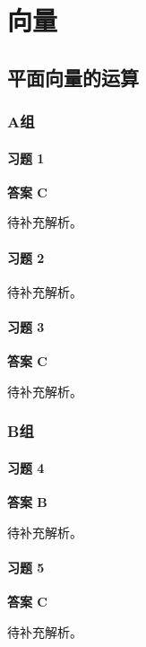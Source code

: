 \chapter{向量}

\section{平面向量的运算}

\subsection*{A组}

\subsubsection*{习题 1}
\begin{solution}
	\textbf{答案 C}

	待补充解析。
\end{solution}

\subsubsection*{习题 2}
\begin{solution}
	待补充解析。
\end{solution}

\subsubsection*{习题 3}
\begin{solution}
	\textbf{答案 C}

	待补充解析。
\end{solution}

\subsection*{B组}

\subsubsection*{习题 4}
\begin{solution}
	\textbf{答案 B}

	待补充解析。
\end{solution}

\subsubsection*{习题 5}
\begin{solution}
	\textbf{答案 C}

	待补充解析。
\end{solution}

